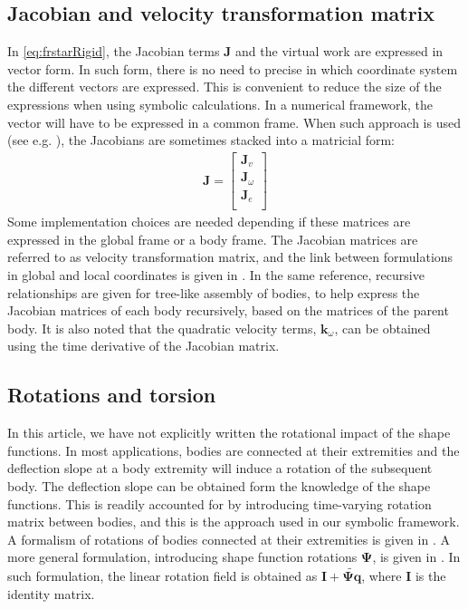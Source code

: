 \documentclass[wes, manuscript]{copernicus}
\renewcommand{\v}[1]{\boldsymbol{#1}}
\newcommand{\m}[1]{\boldsymbol{#1}}
\begin{document}
\subsection{Jacobian and velocity transformation matrix}
In \autoref{eq:frstarRigid}, the Jacobian terms $\v{J}$ and the virtual work are expressed in vector form.
In such form, there is no need to precise in which coordinate system the different vectors are expressed.
This is convenient to reduce the size of the expressions when using symbolic calculations.
In a numerical framework, the vector will have to be expressed in a common frame.
When such approach is used (see e.g. \cite{Lemmer:2018, branlard:2019flex}), the Jacobians are sometimes stacked into a matricial form:
\begin{align}
\m{J} = 
    \begin{bmatrix}
    \v{J}_v \\
    \v{J}_\omega\\
    \v{J}_e \\
    \end{bmatrix}
\end{align}
Some implementation choices are needed depending if these matrices are expressed in the global frame or a body frame.
    The Jacobian matrices are referred to as velocity transformation matrix, and the link between formulations in global and local coordinates is given in \cite{branlard:2019flex}.
    In the same reference, recursive relationships are given for tree-like assembly of bodies, to help express the Jacobian matrices of each body recursively, based on the matrices of the parent body.
    It is also noted that the quadratic velocity terms, $\v{k}_\omega$, can be obtained using the time derivative of the Jacobian matrix.


\subsection{Rotations and torsion}
In this article, we have not explicitly written the rotational impact of the shape functions.
In most applications, bodies are connected at their extremities and the deflection slope at a body extremity will induce a rotation of the subsequent body.
The deflection slope can be obtained form the knowledge of the shape functions.
This is readily accounted for by introducing time-varying rotation matrix between bodies, and this is the approach used in our symbolic framework.
A formalism of rotations of bodies connected at their extremities is given in \cite{branlard:2019flex}.
A more general formulation, introducing shape function rotations $\m{\Psi}$, is given in \citep{Wallrapp:1994, Schwertassek:book, Lemmer:2018}.
In such formulation, the linear rotation field is obtained as $\m{I}+\m{\widetilde{\m{\Psi}\v{q}}}$, where $\m{I}$ is the identity matrix.
\end{document}
